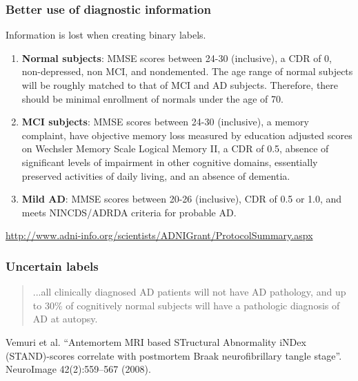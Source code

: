 \begin{frame}
\frametitle{Better use of diagnostic information}
Information is lost when creating binary labels.\par
{\footnotesize
\begin{enumerate}
\item {\bf Normal subjects}: MMSE scores between 24-30 (inclusive), a CDR of 0, non-depressed, non MCI, and nondemented. The age range of normal subjects will be roughly matched to that of MCI and AD subjects. Therefore, there should be minimal enrollment of normals under the age of 70.
\item {\bf MCI subjects}: MMSE scores between 24-30 (inclusive), a memory complaint, have objective memory loss measured by education adjusted scores on Wechsler Memory Scale Logical Memory II, a CDR of 0.5, absence of significant levels of impairment in other cognitive domains, essentially preserved activities of daily living, and an absence of dementia.
\item {\bf Mild AD}: MMSE scores between 20-26 (inclusive), CDR of 0.5 or 1.0, and meets NINCDS/ADRDA criteria for probable AD.
\end{enumerate}
}
\vspace{0.25cm}
\begin{tiny}
\url{http://www.adni-info.org/scientists/ADNIGrant/ProtocolSummary.aspx}
\end{tiny}
\end{frame}

\begin{frame}
\frametitle{Uncertain labels}
\begin{quote}
...all clinically diagnosed AD patients will not have AD pathology, and up to 30\% of cognitively normal subjects will have a pathologic diagnosis of AD at autopsy.
\end{quote}

\begin{center}\begin{tiny}
Vemuri et al. ``Antemortem MRI based STructural Abnormality iNDex (STAND)-scores correlate with postmortem Braak neurofibrillary tangle stage''. NeuroImage 42(2):559--567 (2008).

\end{tiny}\end{center}
\end{frame}


